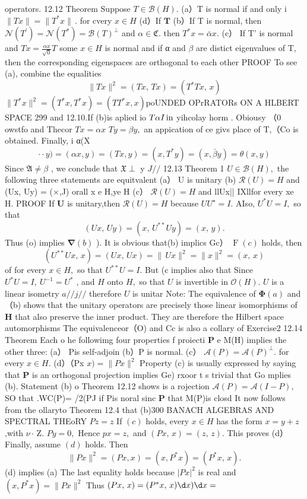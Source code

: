 operators. 12.12 Theorem Suppose $T\in{\mathcal{B}}(H).$ (a）T is normal if and only i $\|T x\|=\|T^{*}x\|\,.$ for cvery $x\in H$ (d）If ${\boldsymbol{T}}$ (b）If T is normal, then $\mathcal{N}(T^{\prime})=\mathcal{N}(T^{*})=\mathcal{B}(T)^{\perp}$ and $\alpha\in{\mathfrak{C}}.$ then $T^{*}x=\bar{\alpha}x.$ (c） If T' is normal and $T x=\textstyle{\frac{\alpha x}{\sqrt{0}}}T$ some $x\in H$ is normal and if α and $\beta$ are distict eigenvalues of T, then the corresponding eigenspaces are orthogonal to each other PROOF To see (a), combine the equalities $$ \|T x\|^{2}=(T x,\,T x)=(T^{*}T x,\,x) $$ $\|T^{*}x\|^{2}=(T^{*}x,T^{*}x)=(T T^{*}x,x)$poUNDED OPrRATORs ON A HLBERT SPACE 299 and 12.10.If (b)is aplied io $T\-\alpha I\operatorname{in}$ yihcolay horm . Obiousy （0 owstfo and Thecor $T x=\alpha x$ $T y=\beta y,$ an appication of ce givs place of T,（Co is obtained. Finally, i α(X $$ \displaystyle\cdot\!\cdot\!y\big)=(\alpha x,y)=(T x,y)=(x,T^{*}y)=(x,\bar{\beta}y)=\displaystyle\theta(x,y) $$ Since ${\mathfrak{A}}\neq\beta$ , we conclude that ${\mathfrak{X}}\perp$ y $J/\slash$ 12.13 Theorem 1 $U\in{\mathcal{B}}(H),$ the following three statements are equitvalent (a） U is unitary (b) ${\mathcal{R}}(U)=H$ and (Ux, Uy) = (×,J) orall x e H,ye H (c） ${\mathcal{R}}(U)=H$ and llUx|| IXllfor every xe H. PROOF If ${\boldsymbol{U}}$ is unitary,then ${\mathcal{R}}(U)=H$ because $U U^{\star}=I.$ AIso, $U^{*}U=I,$ so that $$ (U x,\,U y)=(x,\,U^{**}U y)=(x,\,y). $$ Thus (o) implies $\mathbf{\nabla}(b)$ ). It is obvious that(b) implics Gc） $\operatorname{F}\left(c\right)$ holds, then $$ (U^{**}U x,\,x)=(U x,\,U x)=\|\,U x\|^{2}=\|x\|^{2}=(x,\,x) $$ of for every $x\in H,$ so that $U^{\ast\ast}U=I.$ But (c implies also that Since $U^{*}U=I,\ U^{-1}=U^{*}$ , and $\textstyle H$ onto $\textstyle H,$ so that $U$ is invertible in ${\mathcal{O}}(H).$ $U$ is a linear isometry ${a\!\!\!/}/{j\!\!\!/}/$ therefore $U$ is unitar Note: The equivalence of $\mathbf{\Phi}(a)$ and（b) shows that the unitary operators are precisely those linear isomorphisms of ${\boldsymbol{H}}$ that also preserve the inner product. They are therefore the Hilbert space automorphisms The equivalenceor（O) and Cc is also a collary of Exercise2 12.14 Theorem Each o he followimg four properties f proiecti $\boldsymbol{P}$ e M(H) implies the other three: (a） Pis self-adjoin (b）P is normal. (c） $\mathcal{A}(P)=\mathcal{A}(P)^{\perp}.$ for every $x\in H.$ (d）（Px $x)=\|P x\|^{2}$ Property (c) is usually expressed by saying that $\boldsymbol{P}$ is an orthogonal projection implies Ge) rxoor t s trivial that Go mplies (b). Statement (b) o Theorem 12.12 shows is a rojection $\mathcal{A}(P)=\mathcal{A}(I-P),$ SO that .WC(P)= /2(PJ if Pis noral sinc ${\boldsymbol{P}}$ that M(P)is closd It now follows from the ollaryto Theorem 12.4 that (b)300 BANACH ALGEBRAS AND SPECTRAL THEoRY $P z=z$ If $\left(c\right)$ holds, every $x\in H$ has the form $x=y+z_{}$ ,with $\scriptstyle{\nu}\,{\boldsymbol{\cdot}}$ Z. $P y=0,$ Hence $p x=z,$ and $(P x,\,x)=(z,\,z).$ This proves (d） Finally, assume $(d)$ holds. Then $$ \|P x\|^{2}=(P x,x)=(x,P^{*}x)=(P^{*}x,\,x). $$ (d) implies (a) The last equality holds because $|P x|^{2}$ is real and $(x,P^{*}x)=\|P x\|^{2}$ Thus $(P x,\,x)=(P^{*}x,\,x)\d x)\d x=$ 